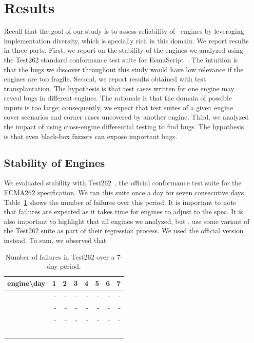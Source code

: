 \documentclass[10pt,conference,anonymous]{IEEEtran}
\begin{document}
\section{Results}
\label{sec:results}

Recall that the goal of our study is to assess reliability of
\js\ engines by leveraging implementation diversity, which is
specially rich in this domain. We report results in three
parts. First, we report on the stability of the engines we analyzed
using the Test262 standard conformance test suite for
EcmaScript~\cite{ecma262-conformance-suite}. The intuition is that the
bugs we discover throughout this study would have low relevance if the
engines are too fragile. Second, we report results obtained with test
transplantation. The hypothesis is that test cases written for one
engine may reveal bugs in different engines. The rationale is that the
domain of possible inputs is too large; consequently, we expect that
test suites of a given engine cover scenarios and corner cases
uncovered by another engine. Third, we analyzed the impact of using
cross-engine differential testing to find bugs. The hypothesis is that
even black-box fuzzers can expose important bugs.

\subsection{Stability of Engines}
\label{sec:stability}

We evaluated stability with Test262~\cite{ecma262-conformance-suite},
the official \js{} conformance test suite for the ECMA262
specification. We ran this suite once a day for seven consecutive
days. Table~\ref{tab:test262} shows the number of failures over this
period. It is important to note that failures are expected as it takes
time for engines to adjust to the spec. It is also important to
highlight that all engines we analyzed, but \chakra{}, use some
variant of the Test262 suite as part of their regression
process. We used the official version
instead. To sum, we observed
that  

\begin{table}[h]
  \centering
  \caption{\label{tab:test262}Number of failures in Test262 over
    a 7-day period.}
  \begin{tabular}{crrrrrrr}
    \toprule
    engine\textbackslash{}day& 1 & 2 & 3 & 4 & 5 & 6 & 7 \\
    \midrule
    \jsc{} & - & - & - & - & - & - & - \\
    \veight{} & - & - & - & - & - & - & - \\
    \chakra{} & - & - & - & - & - & - & - \\
    \smonkey{} & - & - & - & - & - & - & - \\
    \bottomrule 
  \end{tabular}
\end{table}
\end{document}
